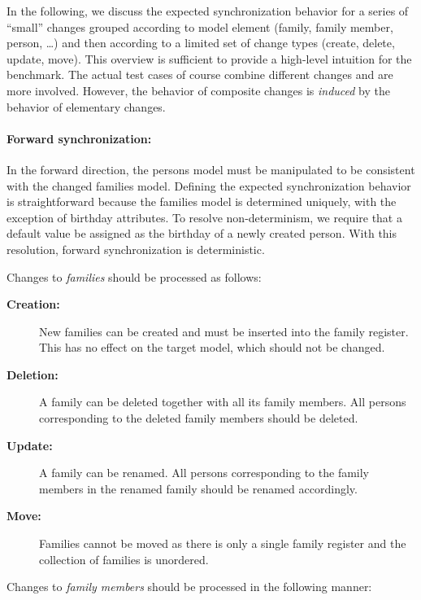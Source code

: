 In the following, we discuss the expected synchronization behavior for a series of ``small'' changes grouped according to model element (family, family member, person, \ldots) and then according to a limited set of change types (create, delete, update, move).
This overview is sufficient to provide a high-level intuition for the benchmark.
The actual test cases of course combine different changes and are more involved. However, the behavior of composite changes is \emph{induced} by the behavior of elementary changes.

\paragraph{Forward synchronization:}

In the forward direction, the persons model must be manipulated to be consistent with the changed families model.
Defining the expected synchronization behavior is straightforward because the families model is determined uniquely, with the exception of birthday attributes.
To resolve non-determinism, we require that a default value be assigned as the birthday of a newly created person.
With this resolution, forward synchronization is deterministic.

\noindent Changes to \emph{families} should be processed as follows:

\begin{description}
    \item[\textbf{Creation:}]
    New families can be created and must be inserted into the family register.
    This has no effect on the target model, which should not be changed.
    
    \item[\textbf{Deletion:}]
    A family can be deleted together with all its family members.
    All persons corresponding to the deleted family members should be deleted.
    
    \item[\textbf{Update:}]
    A family can be renamed.  All persons corresponding to the family members in the renamed family should be renamed accordingly.
    
    \item[\textbf{Move:}]
    Families cannot be moved as there is only a single family register and the collection of families is unordered.
\end{description}

\noindent Changes to \emph{family members} should be processed in the following manner: 

